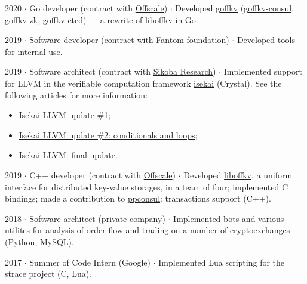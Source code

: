 \documentclass[10pt]{article}
\begin{document}
\medskip

2020 $\cdot$ Go developer (contract with \href{https://offscale.io}{Offscale}) $\cdot$ Developed \href{https://github.com/offscale/goffkv}{goffkv} (\href{https://github.com/offscale/goffkv-consul}{goffkv-consul}, \href{https://github.com/offscale/goffkv-zk}{goffkv-zk}, \href{https://github.com/offscale/goffkv-etcd}{goffkv-etcd}) --- a rewrite of \href{https://github.com/offscale/liboffkv}{liboffkv} in Go.

\medskip

2019 $\cdot$ Software developer (contract with \href{https://fantom.foundation}{Fantom foundation}) $\cdot$ Developed tools for internal use.

\medskip

2019 $\cdot$ Software architect (contract with \href{https://research.sikoba.com}{Sikoba Research}) $\cdot$ Implemented support for LLVM in the verifiable computation framework \href{https://github.com/sikoba/isekai}{isekai} (Crystal). See the following articles for more information:
\begin{itemize}
    \item \href{https://medium.com/sikoba-network/isekai-technical-update-llvm-d5003fc8f009}{Isekai LLVM update \#1};
    \item \href{https://medium.com/sikoba-network/isekai-llvm-update-2-conditionals-and-loops-81296a0eccbf}{Isekai LLVM update \#2: conditionals and loops};
    \item \href{https://medium.com/sikoba-network/isekai-llvm-final-update-894fb6863fcf}{Isekai LLVM: final update}.
\end{itemize}

\medskip

2019 $\cdot$ C++ developer (contract with \href{https://offscale.io}{Offscale}) $\cdot$ Developed \href{https://github.com/offscale/liboffkv}{liboffkv}, a uniform interface for distributed key-value storages, in a team of four; implemented C bindings; made a contribution to \href{https://github.com/oliora/ppconsul}{ppconsul}: transactions support (C++).

\medskip

2018 $\cdot$ Software architect (private company) $\cdot$ Implemented bots and various utilites for analysis of order flow and trading on a number of cryptoexchanges (Python, MySQL).

\medskip

2017 $\cdot$ Summer of Code Intern (Google) $\cdot$ Implemented Lua scripting for the strace project (C, Lua).
\end{document}
